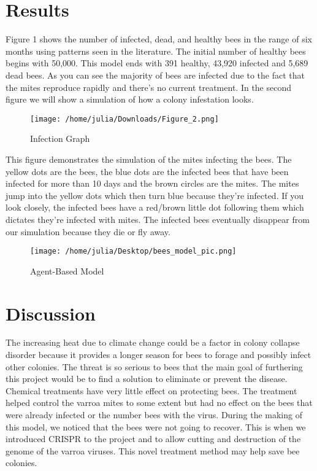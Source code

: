 \documentclass[final,5p,times,twocolumn,authoryear]{elsarticle}
\begin{document}
\section{Results}
\label{Results}
Figure 1 shows the number of infected, dead, and healthy bees in the range of six months using patterns seen in the literature. The initial number of healthy bees begins with 50,000. This model ends with 391 healthy, 43,920 infected and 5,689 dead bees. As you can see the majority of bees are infected due to the fact that the mites reproduce rapidly and there’s no current treatment. In the second figure we will show a simulation of how a colony infestation looks. 

\begin{figure}
  \centering
  \texttt{[image: /home/julia/Downloads/Figure\_2.png]}
  \caption{Infection Graph}
\end{figure}

This figure demonstrates the simulation of the mites infecting the bees. The yellow dots are the bees, the blue dots are the infected bees that have been infected for more than 10 days and the brown circles are the mites. The mites jump into the yellow dots which then turn blue because they’re infected. If you look closely, the infected bees have a red/brown little dot following them which dictates they’re infected with mites. The infected bees eventually disappear from our simulation because they die or fly away.

\begin{figure}
  \centering
  \texttt{[image: /home/julia/Desktop/bees\_model\_pic.png]}
  \caption{Agent-Based Model}
\end{figure}

\section*{Discussion}
\label{Discussion}
The increasing heat due to climate change could be a factor in colony collapse disorder because it provides a longer season for bees to forage and possibly infect other colonies. The threat is so serious to bees that the main goal of furthering this project would be to find a solution to eliminate or prevent the disease. Chemical treatments have very little effect on protecting bees. The treatment helped control the varroa mites to some extent but had no effect on the bees that were already infected or the number bees with the virus. During the making of this model, we noticed that the bees were not going to recover. This is when we introduced CRISPR to the project and to allow cutting and destruction of the genome of the varroa viruses. This novel treatment method may help save bee colonies.  
\end{document}
